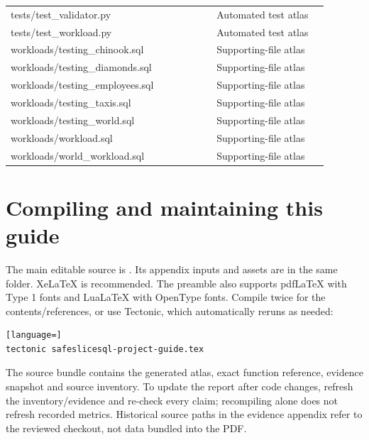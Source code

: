 \begin{longtable}{>{\raggedright\arraybackslash}p{0.598\linewidth}>{\raggedright\arraybackslash}p{0.322\linewidth}}
tests/test\_validator.py & Automated test atlas \\[4pt]
tests/test\_workload.py & Automated test atlas \\[4pt]
workloads/testing\_chinook.sql & Supporting-file atlas \\[4pt]
workloads/testing\_diamonds.sql & Supporting-file atlas \\[4pt]
workloads/testing\_employees.sql & Supporting-file atlas \\[4pt]
workloads/testing\_taxis.sql & Supporting-file atlas \\[4pt]
workloads/testing\_world.sql & Supporting-file atlas \\[4pt]
workloads/workload.sql & Supporting-file atlas \\[4pt]
workloads/world\_workload.sql & Supporting-file atlas \\[4pt]
\bottomrule
\end{longtable}


\section{Compiling and maintaining this guide}

The main editable source is . Its appendix inputs and assets are in the same folder. XeLaTeX is recommended. The preamble also supports pdfLaTeX with Type 1 fonts and LuaLaTeX with OpenType fonts. Compile twice for the contents/references, or use Tectonic, which automatically reruns as needed:


\begin{lstlisting}[language=]
tectonic safeslicesql-project-guide.tex
\end{lstlisting}


The source bundle contains the generated atlas, exact function reference, evidence snapshot and source inventory. To update the report after code changes, refresh the inventory/evidence and re-check every claim; recompiling alone does not refresh recorded metrics. Historical source paths in the evidence appendix refer to the reviewed checkout, not data bundled into the PDF.